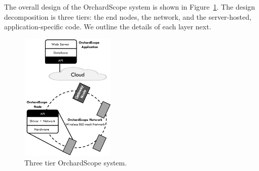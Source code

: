 The overall design of the OrchardScope system is shown in Figure~\ref{fig:architecture}.  
The design decomposition is three tiers: the end nodes, the network, and the server-hosted, application-specific code. 
We outline the details of each layer next. 


\begin{figure}[t]
\centering
\includegraphics[width=0.4\textwidth]{./figures/architecture.pdf}
\caption{Three tier OrchardScope system.}
\label{fig:architecture}
\end{figure}



